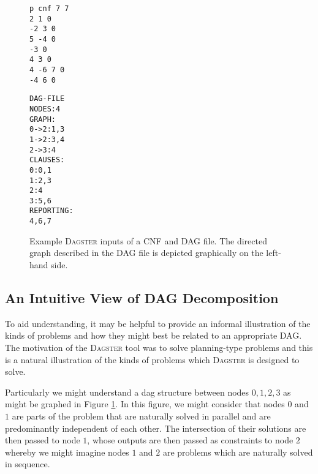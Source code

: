 \documentclass[
10pt, %
a4paper, %
oneside, %
headinclude,footinclude, %
BCOR5mm, %
]{scrartcl}
\begin{document}
\begin{figure}
\centering
\begin{minipage}{0.2\textwidth}
\end{minipage}
\begin{minipage}{0.3\textwidth}
\centering
\begin{Verbatim}[frame=single, label=CNF file]
p cnf 7 7
2 1 0
-2 3 0
5 -4 0
-3 0
4 3 0
4 -6 7 0
-4 6 0
\end{Verbatim}
\end{minipage}
\begin{minipage}{0.3\textwidth}
\centering
\begin{Verbatim}[frame=single, label=DAG file]
DAG-FILE
NODES:4
GRAPH:
0->2:1,3
1->2:3,4
2->3:4
CLAUSES:
0:0,1
1:2,3
2:4
3:5,6
REPORTING:
4,6,7
\end{Verbatim}
\end{minipage}

\caption[Hand-worked CNF and DAG file examples]{Example \textsc{Dagster} inputs of a CNF and DAG file. The directed graph described in the DAG file is depicted graphically on the left-hand side.}\label{fig:cnf_dag_example}
\end{figure}




\subsection{An Intuitive View of DAG Decomposition}

To aid understanding, it may be helpful to provide an informal illustration of the kinds of problems and how they might best be related to an appropriate DAG.
The motivation of the \textsc{Dagster} tool was to solve planning-type problems and this is a natural illustration of the kinds of problems which \textsc{Dagster} is designed to solve.

Particularly we might understand a dag structure between nodes $0,1,2,3$ as might be graphed in Figure \ref{fig:cnf_dag_example}.
In this figure, we might consider that nodes $0$ and $1$ are parts of the problem that are naturally solved in parallel and are predominantly independent of each other.
The intersection of their solutions are then passed to node $1$, whose outputs are then passed as constraints to node $2$ whereby we might imagine nodes $1$ and $2$ are problems which are naturally
solved in sequence.
\end{document}
